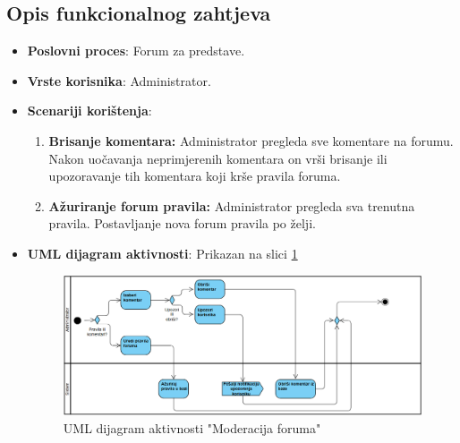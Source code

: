 \subsection{Opis funkcionalnog zahtjeva}  
\begin{itemize}  
    \item \textbf{Poslovni proces}: Forum za predstave.  
    \item \textbf{Vrste korisnika}: Administrator.  
    \item \textbf{Scenariji korištenja}:  
        \begin{enumerate}  
            \item \textbf{Brisanje komentara:}
            Administrator pregleda sve komentare na forumu. Nakon uočavanja neprimjerenih komentara on vrši brisanje ili upozoravanje tih komentara koji krše pravila foruma.   
            \item \textbf{Ažuriranje forum pravila:} 
            Administrator pregleda sva trenutna pravila. Postavljanje nova forum pravila po želji.  
        \end{enumerate}  
    \item \textbf{UML dijagram aktivnosti}: Prikazan na slici \ref{fig:fz9_uml}  
    \begin{figure}[H]
        \centering
        \includegraphics[width=1\linewidth]{Slike/FZ9/FZ9_UML.png}
        \caption{UML dijagram aktivnosti "Moderacija foruma"}
        \label{fig:fz9_uml}
    \end{figure}
\end{itemize}  
\sloppy  
